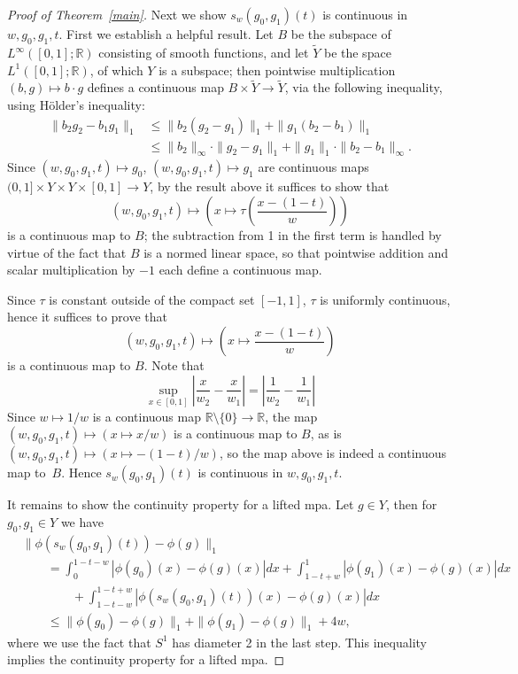 \documentclass[11pt, reqno, english]{amsart}
\theoremstyle{plain}
\theoremstyle{definition}
\newcommand{\R}{\mathbb{R}}
\begin{document}
\begin{proof}[Proof of Theorem~\ref{main}]
  Next we show $s_{w}(g_{0}, g_{1})(t)$ is continuous in $w, g_{0}, g_{1}, t$.
  First we establish a helpful result. Let $B$ be the subspace of
  $L^{\infty}([0, 1]; \mathbb{R})$ consisting of smooth functions, and let
  $\widetilde{Y}$ be the space $L^{1}([0, 1]; \R)$, of which $Y$ is a subspace;
  then pointwise multiplication $(b, g) \mapsto b \cdot g$ defines a continuous
  map $B \times \widetilde{Y} \rightarrow \widetilde{Y}$, via the following inequality,
  using H\"older's inequality:
  \begin{align*}
    \|b_{2}g_{2} - b_{1}g_{1}\|_{1} &\le \|b_{2}(g_{2} - g_{1})\|_{1} +
    \|g_{1}(b_{2} - b_{1})\|_{1}\\
    &\le \|b_{2}\|_{\infty} \cdot \|g_{2} - g_{1}\|_{1} + \|g_{1}\|_{1} \cdot
    \|b_{2} - b_{1}\|_{\infty}.
  \end{align*}
  Since $(w, g_{0}, g_{1}, t) \mapsto g_{0}$, $(w, g_{0}, g_{1}, t) \mapsto
  g_{1}$ are continuous maps $(0, 1] \times Y \times Y \times [0, 1]
  \rightarrow Y$, by the result above it suffices to show that
  $$(w, g_{0}, g_{1}, t) \mapsto \left(x \mapsto \tau\left(\frac{x - (1 -
  t)}{w}\right)\right)$$
  is a continuous map to $B$; the subtraction from 1 in the first term is
  handled by virtue of the fact that $B$ is a normed linear space, so that
  pointwise addition and scalar multiplication by $-1$ each define a continuous
  map.

  Since $\tau$ is constant outside of the compact set $[-1, 1]$, $\tau$ is
  uniformly continuous, hence it suffices to prove that
  $$(w, g_{0}, g_{1}, t) \mapsto \left(x \mapsto \frac{x - (1 - t)}{w}\right)$$
  is a continuous map to $B$. Note that
  $$\sup_{x \in [0, 1]}\left|\frac{x}{w_{2}} - \frac{x}{w_{1}}\right| =
  \left|\frac{1}{w_{2}} - \frac{1}{w_{1}}\right|$$
  Since $w \mapsto 1/w$ is a continuous map $\mathbb{R}\setminus\{0\}
  \rightarrow \mathbb{R}$, the map $(w, g_{0}, g_{1}, t) \mapsto (x \mapsto
  x/w)$ is a continuous map to $B$, as is $(w, g_{0}, g_{1}, t) \mapsto (x
  \mapsto -(1 - t)/w)$, so the map above is indeed a continuous map to~$B$.
  Hence $s_{w}(g_{0}, g_{1})(t)$ is continuous in $w, g_{0}, g_{1}, t$.

  It remains to show the continuity property for a lifted mpa. Let $g \in Y$,
  then for $g_{0}, g_{1} \in Y$ we have
  \begin{align*}
    &\|\phi(s_{w}(g_{0}, g_{1})(t)) - \phi(g)\|_{1}\\
    &\qquad = \int_{0}^{1 - t - w}|\phi(g_{0})(x) - \phi(g)(x)|dx + \int_{1 - t
    + w}^{1}|\phi(g_{1})(x) - \phi(g)(x)|dx\\
    &\qquad\qquad + \int_{1 - t - w}^{1 - t + w}|\phi(s_{w}(g_{0},
    g_{1})(t))(x) - \phi(g)(x)|dx\\
    &\qquad \le \|\phi(g_{0}) - \phi(g)\|_{1} + \|\phi(g_{1}) - \phi(g)\|_{1} +
    4w,
  \end{align*}
  where we use the fact that $S^{1}$ has diameter 2 in the last step. This
  inequality implies the continuity property for a lifted mpa.
  

\end{proof}
\end{document}
